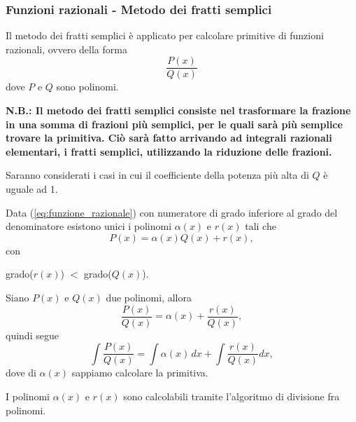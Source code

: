 \subsubsection{Funzioni razionali - Metodo dei fratti semplici}
Il metodo dei fratti semplici è applicato per calcolare primitive di funzioni razionali, ovvero della forma
\begin{equation}\label{eq:funzione_razionale}
    \frac{P(x)}{Q(x)}
\end{equation}
dove $P$ e $Q$ sono \gls{polinomi}. 

\textbf{N.B.: Il metodo dei fratti semplici consiste nel trasformare la frazione in una somma di frazioni più semplici, per le quali sarà più semplice trovare la primitiva. Ciò sarà fatto arrivando ad integrali razionali elementari, i fratti semplici, utilizzando la riduzione delle frazioni.}

Saranno considerati i casi in cui il coefficiente della potenza più alta di $Q$ è uguale ad 1.

\begin{proposition}
    Data (\ref{eq:funzione_razionale}) con numeratore di grado inferiore al grado del denominatore esistono unici i polinomi $\alpha(x)$ e $r(x)$ tali che
    \begin{equation*}
        P(x) =  \alpha(x) Q(x) + r(x),
    \end{equation*}
    con
    \begin{center}
        grado($r(x)$) $<$ grado($Q(x)$).
    \end{center}
\end{proposition}

\begin{remark}
    Siano $P(x)$ e $Q(x)$ due \gls{polinomi}, allora
    \begin{equation*}
        \frac{P(x)}{Q(x)}=\alpha(x)+\frac{r(x)}{Q(x)},
    \end{equation*}
    quindi segue
    \begin{equation*}
        \int \frac{P(x)}{Q(x)} = \int\alpha(x)\, dx + \int\frac{r(x)}{Q(x)} dx,
    \end{equation*}
    dove di $\alpha(x)$ sappiamo calcolare la primitiva.
\end{remark}

I polinomi $\alpha(x)$ e $r(x)$ sono calcolabili tramite l'algoritmo di divisione fra polinomi.

